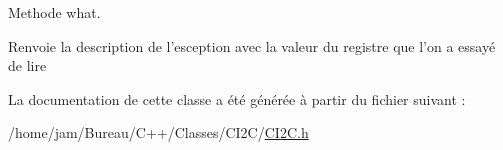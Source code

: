 Methode what. 

\begin{DoxyReturn}{Renvoie}
la description de l'esception avec la valeur du registre que l'on a essayé de lire 
\end{DoxyReturn}


La documentation de cette classe a été générée à partir du fichier suivant \+:\begin{DoxyCompactItemize}
\item 
/home/jam/\+Bureau/\+C++/\+Classes/\+C\+I2\+C/\hyperlink{CI2C_8h}{C\+I2\+C.\+h}\end{DoxyCompactItemize}
